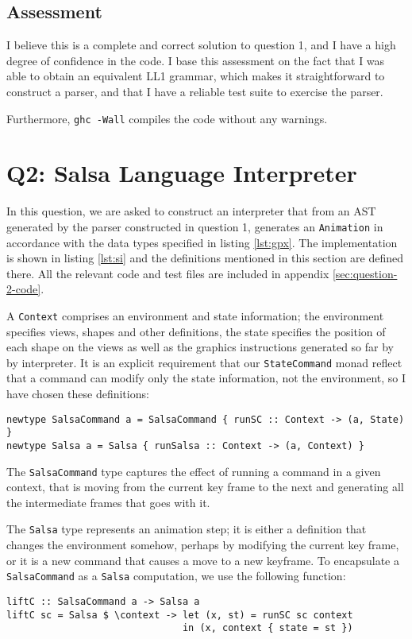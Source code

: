 \documentclass[
paper=a4,
oneside,
fontsize=11pt,
numbers=noenddot,
headinclude=false, %
footinclude=false, %
fleqn,             %
DIV=8
]{scrartcl}
\begin{document}
\subsection{Assessment}
\label{sec:assessment}

I believe this is a complete and correct solution to question 1, and I have a
high degree of confidence in the code. I base this assessment on the fact that
I was able to obtain an equivalent \acs{LL1} grammar, which makes it
straightforward to construct a parser, and that I have a reliable test suite to
exercise the parser.

Furthermore, {\tt ghc -Wall} compiles the code without any warnings.

\clearpage
\section{Q2: Salsa Language Interpreter}

In this question, we are asked to construct an interpreter that from an \ac{AST}
generated by the parser constructed in question 1, generates an {\tt Animation}
in accordance with the data types specified in listing \ref{lst:gpx}. The
implementation is shown in listing \ref{lst:si} and the definitions mentioned in
this section are defined there. All the relevant code and test files are
included in appendix \ref{sec:question-2-code}.


A {\tt Context} comprises an environment and state information; the environment
specifies views, shapes and other definitions, the state specifies the position
of each shape on the views as well as the graphics instructions generated so far
by by interpreter. It is an explicit requirement that our {\tt StateCommand}
monad reflect that a command can modify only the state information, not the
environment, so I have chosen these definitions:
\begin{lstlisting}
newtype SalsaCommand a = SalsaCommand { runSC :: Context -> (a, State) }
newtype Salsa a = Salsa { runSalsa :: Context -> (a, Context) }
\end{lstlisting}
The {\tt SalsaCommand} type captures the effect of running a command in a given
context, that is moving from the current key frame to the next and generating
all the intermediate frames that goes with it.

The {\tt Salsa} type represents an animation step; it is either a definition that
changes the environment somehow, perhaps by modifying the current key frame, or
it is a new command that causes a move to a new keyframe. To encapsulate a {\tt
  SalsaCommand} as a {\tt Salsa} computation, we use the following function:
\begin{lstlisting}
liftC :: SalsaCommand a -> Salsa a
liftC sc = Salsa $ \context -> let (x, st) = runSC sc context
                               in (x, context { state = st })
\end{lstlisting}%
\end{document}
